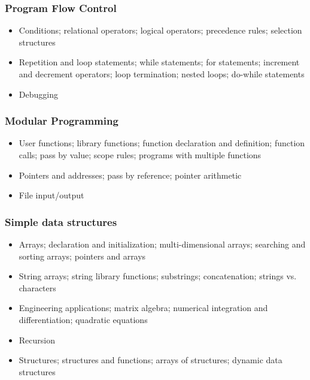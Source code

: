 \documentclass{article}
\begin{document}
\subsubsection{Program Flow Control}
\begin{itemize}
\item Conditions; relational operators; logical operators; precedence rules; selection structures
\item Repetition and loop statements; while statements; for statements; increment and
decrement operators; loop termination; nested loops; do-while statements
\item Debugging
\end{itemize}

\subsubsection{Modular Programming}
\begin{itemize}
\item User functions; library functions; function declaration and definition; function calls; pass
by value; scope rules; programs with multiple functions
\item Pointers and addresses; pass by reference; pointer arithmetic
\item File input/output
\end{itemize}

\subsubsection{Simple data structures}
\begin{itemize}
\item Arrays; declaration and initialization; multi-dimensional arrays; searching and sorting
arrays; pointers and arrays
\item String arrays; string library functions; substrings; concatenation; strings vs. characters
\item Engineering applications; matrix algebra; numerical integration and differentiation;
quadratic equations
\item Recursion
\item Structures; structures and functions; arrays of structures; dynamic data structures
\end{itemize}

\makeatletter
\def\blfootnote{\gdef\@thefnmark{}\@footnotetext}
\makeatother

\blfootnote{Last modified \today.}
\end{document}
